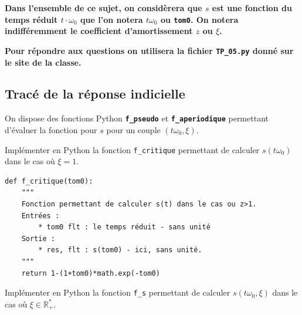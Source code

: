 \textbf{Dans l'ensemble de ce sujet, on considèrera que $s$ est une fonction du temps réduit $t\cdot\omega_0$ que l'on notera $t\omega_0$ ou \lstinline{tom0}. On notera indifféremment le coefficient d'amortissement $z$ ou $\xi$.}



\textbf{Pour répondre aux questions on utilisera la fichier \lstinline{TP_05.py} donné sur le site de la classe.}
\fi 



\subsection*{Tracé de la réponse indicielle}
\ifprof
\else
On dispose des fonctions Python \textbf{\lstinline{f_pseudo}} et \textbf{\lstinline{f_aperiodique}} permettant d'évaluer la fonction pour $s$ pour un couple $(t\omega_0,\xi)$.
\fi



\begin{question}
Implémenter en Python la fonction \lstinline{f_critique} permettant de calculer 
$s(t\omega_0)$ dans le cas où $\xi=1$. %
\end{question}
\ifprof
\else
\fi
\ifprof
\begin{lstlisting}
def f_critique(tom0):
    """
    Fonction permettant de calculer s(t) dans le cas ou z>1. 
    Entrées :
        * tom0 flt : le temps réduit - sans unité
    Sortie : 
        * res, flt : s(tom0) - ici, sans unité.
    """
    return 1-(1+tom0)*math.exp(-tom0) 
\end{lstlisting}
\else

\fi


\begin{question}
Implémenter en Python la fonction \lstinline{f_s} permettant de calculer  $s(t\omega_0,\xi)$ dans le cas où $\xi\in \mathbb{R}_+^*$. %
\end{question}

